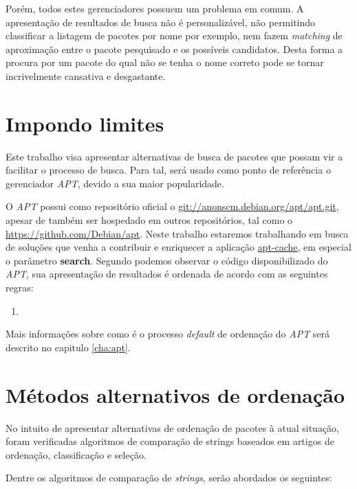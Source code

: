 Porém, todos estes gerenciadores possuem um problema em comum. A apresentação de resultados de busca não é personalizável, não permitindo classificar a listagem de pacotes por nome por exemplo, nem fazem \textit{matching} de aproximação  entre o pacote pesquisado e os possíveis candidatos. Desta forma a procura por um pacote do qual não se tenha o nome correto pode se tornar incrivelmente cansativa e desgastante.

\section{Impondo limites} %
\label{sub:impondo_limites}


Este trabalho visa apresentar alternativas de busca de pacotes que possam vir a facilitar  o processo de busca. Para tal, será usado como ponto de referência o gerenciador \textit{APT}, devido a sua maior popularidade.

O \textit{APT} possui como repositório oficial o \url{git://anonscm.debian.org/apt/apt.git}, apesar de também ser hospedado em outros repositórios, tal como o \url{https://github.com/Debian/apt}. Neste trabalho estaremos trabalhando em busca de soluções que venha a contribuir e enriquecer a aplicação \href{https://github.com/Debian/apt/blob/debian/experimental/cmdline/apt-cache.cc}{apt-cache}, em especial o parâmetro \textbf{search}. Segundo podemos observar o código disponibilizado do \textit{APT}, sua apresentação de resultados é ordenada de acordo com as seguintes regras:

\begin{enumerate}
	\item 
\end{enumerate}

Mais informações sobre como é o processo \textit{default} de ordenação do \textit{APT} será descrito no capitulo \ref{cha:apt}.


\section{Métodos alternativos de ordenação} %
\label{sec:m_todos_alternativos_de_ordena_o}

No intuito de apresentar alternativas de ordenação de pacotes à atual situação, foram verificadas algoritmos de comparação de strings baseados em artigos de ordenação, classificação e seleção.

Dentre os algoritmos de comparação de \textit{strings}, serão abordados os seguintes:

